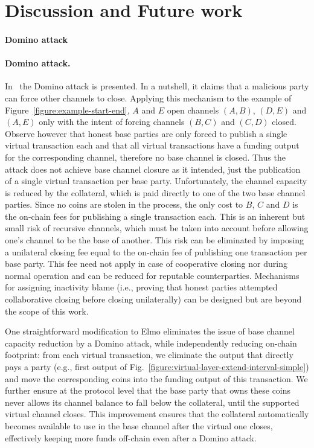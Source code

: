\section{Discussion and Future work}
\label{sec:future-work}
\makeatletter%
%
  {\paragraph{Domino attack}}%
  {\paragraph{Domino attack.}}%
\makeatother%
In~\cite{donner} the Domino attack is presented. In a nutshell, it claims that a
malicious party can force other channels to close. Applying this mechanism to
the example of Figure~\ref{figure:example-start-end}, $A$ and $E$ open channels
$(A, B)$, $(D, E)$ and $(A, E)$ only with the intent of forcing channels $(B,
C)$ and $(C, D)$ closed. Observe however that honest base parties are only
forced to publish a single virtual transaction each and that all virtual
transactions have a funding output for the corresponding channel, therefore no
base channel is closed. Thus the attack does not achieve base channel closure as
it intended, just the publication of a single virtual transaction per base
party. Unfortunately, the channel capacity is reduced by the collateral, which
is paid directly to one of the two base channel parties. Since no coins are
stolen in the process, the only cost to $B$, $C$ and $D$ is the on-chain fees
for publishing a single transaction each. This is an inherent but small risk of
recursive channels, which must be taken into account before allowing one's
channel to be the base of another. This risk can be eliminated by imposing a
unilateral closing fee equal to the on-chain fee of publishing one transaction
per base party. This fee need not apply in case of cooperative closing nor
during normal operation and can be reduced for reputable counterparties.
Mechanisms for assigning inactivity blame (i.e., proving that honest parties
attempted collaborative closing before closing unilaterally) can be designed but
are beyond the scope of this work.

One straightforward modification to Elmo eliminates the issue of base channel
capacity reduction by a Domino attack, while independently reducing on-chain
footprint: from each virtual transaction, we eliminate the output that directly
pays a party (e.g., first output of
Fig.~\ref{figure:virtual-layer-extend-interval-simple}) and move the
corresponding coins into the funding output of this transaction. We further
ensure at the protocol level that the base party that owns these coins never
allows its channel balance to fall below the collateral, until the supported
virtual channel closes. This improvement ensures that the collateral
automatically becomes available to use in the base channel after the virtual one
closes, effectively keeping more funds off-chain even after a Domino attack.

